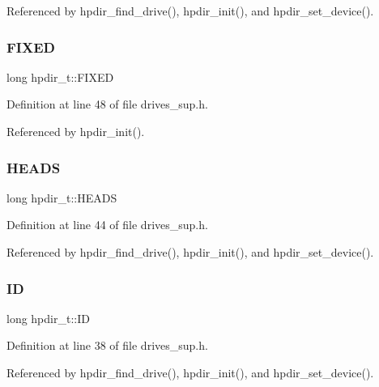 Referenced by hpdir\+\_\+find\+\_\+drive(), hpdir\+\_\+init(), and hpdir\+\_\+set\+\_\+device().

\mbox{\label{structhpdir__t_a69855da74bcc15b10039a51e3680a994}} 
\subsubsection{\texorpdfstring{F\+I\+X\+ED}{FIXED}}
{\footnotesize\ttfamily long hpdir\+\_\+t\+::\+F\+I\+X\+ED}



Definition at line 48 of file drives\+\_\+sup.\+h.



Referenced by hpdir\+\_\+init().

\mbox{\label{structhpdir__t_a0b636f508776a07e2aaba4704dc124f2}} 
\subsubsection{\texorpdfstring{H\+E\+A\+DS}{HEADS}}
{\footnotesize\ttfamily long hpdir\+\_\+t\+::\+H\+E\+A\+DS}



Definition at line 44 of file drives\+\_\+sup.\+h.



Referenced by hpdir\+\_\+find\+\_\+drive(), hpdir\+\_\+init(), and hpdir\+\_\+set\+\_\+device().

\mbox{\label{structhpdir__t_aae1a879f64c0ee2dc353d3581e8deec9}} 
\subsubsection{\texorpdfstring{ID}{ID}}
{\footnotesize\ttfamily long hpdir\+\_\+t\+::\+ID}



Definition at line 38 of file drives\+\_\+sup.\+h.



Referenced by hpdir\+\_\+find\+\_\+drive(), hpdir\+\_\+init(), and hpdir\+\_\+set\+\_\+device().

